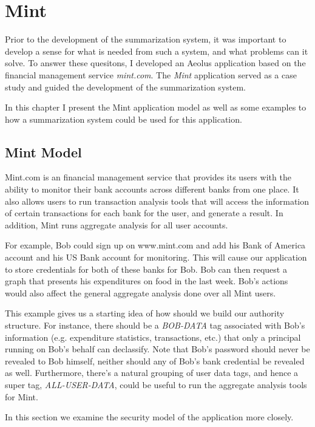 \chapter{Mint}\label{mint}

Prior to the development of the summarization system, it was important to develop a sense for what is needed from such a system, and what problems can it solve. To answer these quesitons, I developed an Aeolus application based on the financial management service \emph{mint.com}. The \emph{Mint} application served as a case study and guided the development of the summarization system.

In this chapter I present the Mint application model as well as some examples to how a summarization system could be used for this application.

\section{Mint Model}

Mint.com is an financial management service that provides its users with the ability to monitor their bank accounts across different banks from one place. It also allows users to run transaction analysis tools that will access the information of certain transactions for each bank for the user, and generate a result. In addition, Mint runs aggregate analysis for all user accounts.

For example, Bob could sign up on www.mint.com and add his Bank of America account and his US Bank account for monitoring. This will cause our application to store credentials for both of these banks for Bob. Bob can then request a graph that presents his expenditures on food in the last week. Bob's actions would also affect the general aggregate analysis done over all Mint users.

This example gives us a starting idea of how should we build our authority structure. For instance, there should be a \emph{BOB-DATA} tag associated with Bob's information (e.g. expenditure statistics, transactions, etc.) that only a principal running on Bob's behalf can declassify. Note that Bob's password should never be revealed to Bob himself, neither should any of Bob's bank credential be revealed as well. Furthermore, there's a natural grouping of user data tags, and hence a super tag, \emph{ALL-USER-DATA}, could be useful to run the aggregate analysis tools for Mint.

In this section we examine the security model of the application more closely.

